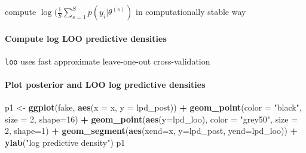 \documentclass[
]{article}
\newenvironment{Shaded}{\begin{snugshade}}{\end{snugshade}}
\newcommand{\DataTypeTok}[1]{\textcolor[rgb]{0.13,0.29,0.53}{#1}}
\newcommand{\DecValTok}[1]{\textcolor[rgb]{0.00,0.00,0.81}{#1}}
\newcommand{\KeywordTok}[1]{\textcolor[rgb]{0.13,0.29,0.53}{\textbf{#1}}}
\newcommand{\NormalTok}[1]{#1}
\newcommand{\OperatorTok}[1]{\textcolor[rgb]{0.81,0.36,0.00}{\textbf{#1}}}
\newcommand{\StringTok}[1]{\textcolor[rgb]{0.31,0.60,0.02}{#1}}
\begin{document}
compute \(\log(\frac{1}{S}\sum_{s=1}^S p(y_i|\theta^{(s)})\) in
computationally stable way

\begin{Shaded}
\end{Shaded}

\hypertarget{compute-log-loo-predictive-densities}{%
\paragraph{Compute log LOO predictive
densities}\label{compute-log-loo-predictive-densities}}

\texttt{loo} uses fast approximate leave-one-out cross-validation

\begin{Shaded}
\end{Shaded}

\hypertarget{plot-posterior-and-loo-log-predictive-densities}{%
\paragraph{Plot posterior and LOO log predictive
densities}\label{plot-posterior-and-loo-log-predictive-densities}}

\begin{Shaded}
\begin{Highlighting}[]
\NormalTok{p1 <-}\StringTok{ }\KeywordTok{ggplot}\NormalTok{(fake, }\KeywordTok{aes}\NormalTok{(}\DataTypeTok{x =}\NormalTok{ x, }\DataTypeTok{y =}\NormalTok{ lpd_post)) }\OperatorTok{+}
\StringTok{  }\KeywordTok{geom_point}\NormalTok{(}\DataTypeTok{color =} \StringTok{"black"}\NormalTok{, }\DataTypeTok{size =} \DecValTok{2}\NormalTok{, }\DataTypeTok{shape=}\DecValTok{16}\NormalTok{) }\OperatorTok{+}
\StringTok{  }\KeywordTok{geom_point}\NormalTok{(}\KeywordTok{aes}\NormalTok{(}\DataTypeTok{y=}\NormalTok{lpd_loo), }\DataTypeTok{color =} \StringTok{"grey50"}\NormalTok{, }\DataTypeTok{size =} \DecValTok{2}\NormalTok{, }\DataTypeTok{shape=}\DecValTok{1}\NormalTok{) }\OperatorTok{+}
\StringTok{  }\KeywordTok{geom_segment}\NormalTok{(}\KeywordTok{aes}\NormalTok{(}\DataTypeTok{xend=}\NormalTok{x, }\DataTypeTok{y=}\NormalTok{lpd_post, }\DataTypeTok{yend=}\NormalTok{lpd_loo)) }\OperatorTok{+}
\StringTok{  }\KeywordTok{ylab}\NormalTok{(}\StringTok{"log predictive density"}\NormalTok{)}
\NormalTok{p1}
\end{Highlighting}
\end{Shaded}
\end{document}
